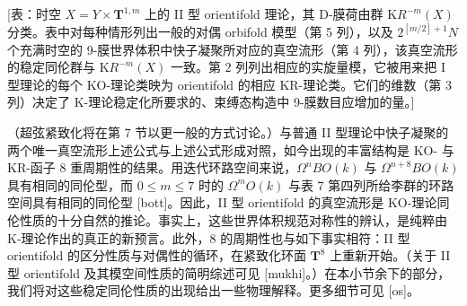 \documentclass[11pt,a4paper]{ctexart}
\begin{document}
{[}表：时空 \(X=Y\times {\mathbf T}^{1,m}\) 上的 II 型 orientifold 理论，其 D-膜荷由群 \({\mathrm KR}^{-m}(X)\) 分类。表中对每种情形列出一般的对偶 orbifold 模型（第 5 列），以及 \(2^{[m/2]+1}N\) 个充满时空的 9-膜世界体积中快子凝聚所对应的真空流形（第 4 列），该真空流形的稳定同伦群与 \({\mathrm KR}^{-m}(X)\) 一致。第 2 列列出相应的实旋量模，它被用来把 I 型理论的每个 KO-理论类映为 orientifold 的相应 KR-理论类。它们的维数（第 3 列）决定了 K-理论稳定化所要求的、束缚态构造中 9-膜数目应增加的量。{]}

（超弦紧致化将在第 7 节以更一般的方式讨论。）与普通 II 型理论中快子凝聚的两个唯一真空流形上述公式与上述公式形成对照，如今出现的丰富结构是 KO- 与 KR-函子 8 重周期性的结果。用迭代环路空间来说，\(\Omega^nBO(k)\) 与 \(\Omega^{n+8}BO(k)\) 具有相同的同伦型，而 \(0\leq m\leq 7\) 时的 \(\Omega^mO(k)\) 与表 7 第四列所给李群的环路空间具有相同的同伦型 [bott]。因此，II 型 orientifold 的真空流形是 KO-理论同伦性质的十分自然的推论。事实上，这些世界体积规范对称性的辨认，是纯粹由 K-理论作出的真正的新预言。此外，8 的周期性也与如下事实相符：II 型 orientifold 的区分性质与对偶性的循环，在紧致化环面 \({\mathbf T}^8\) 上重新开始。（关于 II 型 orientifold 及其模空间性质的简明综述可见 [mukhi]。）在本小节余下的部分，我们将对这些稳定同伦性质的出现给出一些物理解释。更多细节可见 [os]。
\end{document}
